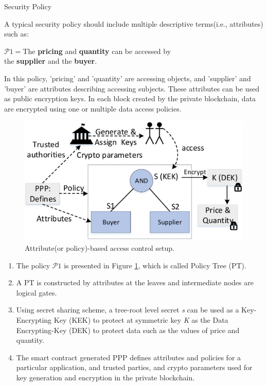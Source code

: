\documentclass[11pt]{beamer}
\begin{document}
\begin{frame}[allowframebreaks]{Security Policy}

A typical security policy should include multiple descriptive terms(i.e., attributes) such as:
\begin{center}
$\mathcal{P}1=$The \textbf{pricing} and \textbf{quantity} can be accessed by\\the \textbf{supplier} and the \textbf{buyer}.
\end{center}
In this policy, 'pricing' and 'quantity' are accessing objects, and 'supplier' and 'buyer' are attributes describing accessing subjects. These attributes can be used as public encryption keys. In each block created by the private blockchain, data are encrypted using one or multiple data access policies.

\begin{figure}
\includegraphics[scale=0.2]{abacsetup.png}
\caption{Attribute(or policy)-based access control setup.}
\label{fig:abacsetup}
\end{figure}

\begin{enumerate}
\item The policy $\mathcal{P}1$ is presented in Figure \ref{fig:abacsetup}, which is called Policy Tree (PT).
\item A PT is constructed by attributes at the leaves and intermediate nodes are logical gates.
\item Using secret sharing scheme, a tree-root level secret \textit{s} can be used as a Key-Encrypting Key (KEK) to protect at symmetric key \textit{K} as the Data Encrypting-Key (DEK) to protect data such as the values of price and quantity.
\item The smart contract generated PPP defines attributes and policies for a particular application, and trusted parties, and crypto parameters used for key generation and encryption in the private blockchain.
\end{enumerate}

\end{frame}
\end{document}
